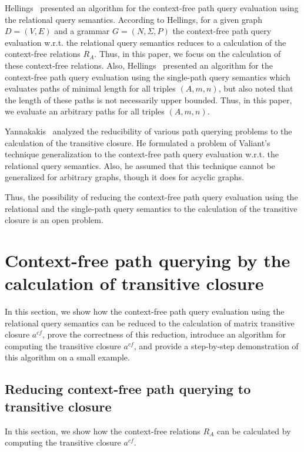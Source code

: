 \documentclass[runningheads,a4paper]{llncs}
\begin{document}
Hellings~\cite{hellingsRelational} presented an algorithm for the context-free path query evaluation using the relational query semantics. According to Hellings, for a given graph $D = (V, E)$ and a grammar $G = (N, \Sigma, P)$ the context-free path query evaluation w.r.t. the relational query semantics reduces to a calculation of the context-free relations $R_A$. Thus, in this paper, we focus on the calculation of these context-free relations. Also, Hellings~\cite{hellingsRelational} presented an algorithm for the context-free path query evaluation using the single-path query semantics which evaluates paths of minimal length for all triples $(A,m,n)$, but also noted that the length of these paths is not necessarily upper bounded. Thus, in this paper, we evaluate an arbitrary paths for all triples $(A,m,n)$.

Yannakakis~\cite{transitive-closure} analyzed the reducibility of various path querying problems to the calculation of the transitive closure. He formulated a problem of Valiant's technique generalization to the context-free path query evaluation w.r.t. the relational query semantics. Also, he assumed that this technique cannot be generalized for arbitrary graphs, though it does for acyclic graphs.

Thus, the possibility of reducing the context-free path query evaluation using the relational and the single-path query semantics to the calculation of the transitive closure is an open problem.

\section{Context-free path querying by the calculation of transitive closure}%
In this section, we show how the context-free path query evaluation using the relational query semantics can be reduced to the calculation of matrix transitive closure $a^{cf}$, prove the correctness of this reduction, introduce an algorithm for computing the transitive closure $a^{cf}$, and provide a step-by-step demonstration of this algorithm on a small example.

\subsection{Reducing context-free path querying to transitive closure} \label{section_reducing}
In this section, we show how the context-free relations $R_A$ can be calculated by computing the transitive closure $a^{cf}$.
\end{document}

